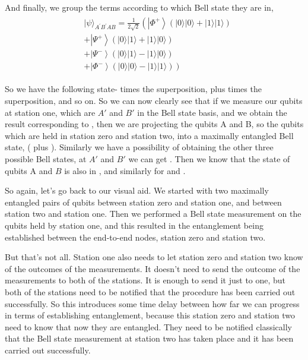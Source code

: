 And finally, we group the terms according to which Bell state they are in,
\begin{align}
\begin{aligned}
&|\psi\rangle_{A^{\prime} B^{\prime} A B}=\frac{1}{2 \sqrt{2}}\left(\left|\Phi^{+}\right\rangle(|0\rangle|0\rangle+|1\rangle|1\rangle)\right.\\
&+\left|\Psi^{+}\right\rangle(|0\rangle|1\rangle+|1\rangle|0\rangle)\\
&+\left|\Psi^{-}\right\rangle(|0\rangle|1\rangle-|1\rangle|0\rangle)\\
&\left.+\left|\Phi^{-}\right\rangle(|0\rangle|0\rangle-|1\rangle|1\rangle)\right)
\end{aligned}
\end{align}

So we have the following state-  \ket{\Phi^+} times the superposition, plus \ket{\Psi^+} times the superposition, and so on. So we can now clearly see that if we measure our qubits at station one, which are  $A'$ and $B'$ in the Bell state basis, and we obtain the result corresponding to  \ket{\Phi^+}, then we are projecting the qubits A and B, so the qubits which are held in station zero and station two, into a maximally entangled Bell state,  \ket{\Phi^+} ( plus ). Similarly we have a possibility of obtaining the other three possible Bell states, at  $A'$ and $B'$ we can get \ket{\Psi^+}. Then we know that the state of qubits A and $B$ is also in \ket{\Psi^+}, and similarly for \ket{\Psi^-} and \ket{\Phi^-}.

So again, let's go back to our visual aid. We started with two maximally entangled pairs of qubits between station zero and station one, and between station two and station one. Then we performed a Bell state measurement on the qubits held by station one, and this resulted in the entanglement being established between the end-to-end nodes, station zero and station two.

But that's not all. Station one also needs to let station zero and station two know of the outcomes of the measurements. It doesn't need to send the outcome of the measurements to both of the stations. It is enough to send it just to one, but both of the stations need to be notified that the procedure has been carried out successfully. So this introduces some time delay between how far we can progress in terms of establishing entanglement, because this station zero and station two need to know that now they are entangled. They need to be notified classically that the Bell state measurement at station two has taken place and it has been carried out successfully.

